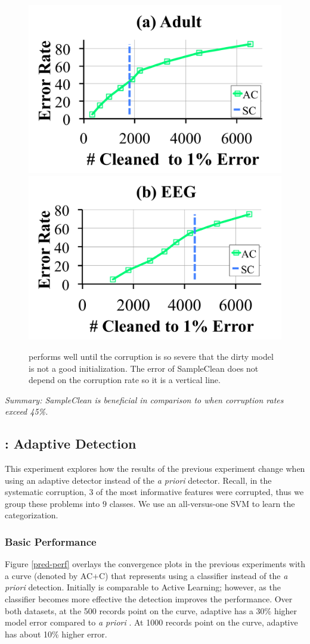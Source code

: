 \begin{figure}[t]
\centering
 \includegraphics[width=0.49\columnwidth]{exp/exp9a.pdf}
  \includegraphics[width=0.49\columnwidth]{exp/exp9b.pdf}\vspace{-1em}
 \caption{\sys performs well until the corruption is so severe that the dirty model is not a good initialization. The error of SampleClean does not depend on the corruption rate so it is a vertical line.  \label{bias}}
\end{figure}

\vspace{0.25em}

\noindent \emph{Summary: SampleClean is beneficial in comparison to \sys when corruption rates exceed 45\%.}

\subsection{\sys: Adaptive Detection}
This experiment explores how the results of the previous experiment change when using an adaptive detector instead of the \emph{a priori} detector.
Recall, in the systematic corruption, 3 of the most informative features were corrupted, thus we group these problems into $9$ classes.
We use an all-versus-one SVM to learn the categorization.

\subsubsection{Basic Performance}
Figure \ref{pred-perf} overlays the convergence plots in the previous experiments with a curve (denoted by AC+C) that represents \sys using a classifier instead of the \emph{a priori} detection. Initially \sys is comparable to Active Learning; however, as the classifier becomes more effective the detection improves the performance.
Over both datasets, at the 500 records point on the curve, adaptive \sys has a 30\% higher model error compared to \emph{a priori} \sys.
At 1000 records point on the curve, adaptive \sys has about 10\% higher error.

